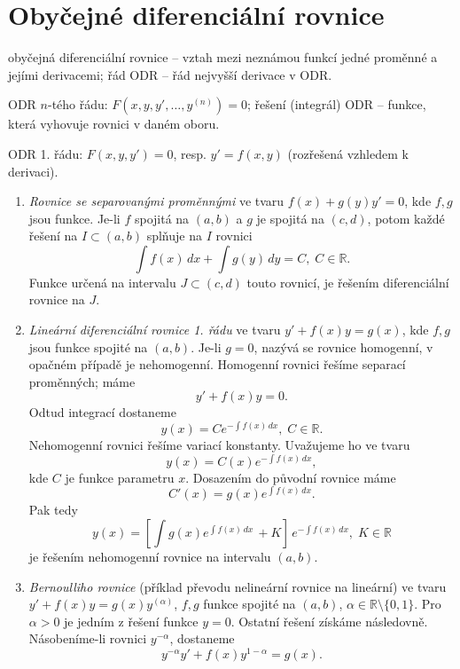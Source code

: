 \chapter{Obyčejné diferenciální rovnice}

obyčejná diferenciální rovnice -- vztah mezi neznámou funkcí jedné proměnné a jejími derivacemi;
řád ODR -- řád nejvyšší derivace v ODR.

ODR $n$-tého řádu: $F(x,y,y',\ldots,y^{(n)})=0$;
řešení (integrál) ODR -- funkce, která vyhovuje rovnici v daném oboru.

ODR 1. řádu: $F(x,y,y')=0$, resp. $y'=f(x,y)$ (rozřešená vzhledem k derivaci).

\begin{enumerate}
   \item \emph{Rovnice se separovanými proměnnými} ve tvaru $f(x)+g(y)y'=0$,
   kde $f,g$ jsou funkce. 
   Je-li $f$ spojitá na $(a,b)$ a $g$ je spojitá na $(c,d)$,
   potom každé řešení na $I\subset(a,b)$ splňuje na $I$ rovnici
   \[
      \int f(x)\,dx + \int g(y)\,dy = C, \; C\in\mathbb{R}.
   \]
   Funkce určená na intervalu $J\subset(c,d)$ touto rovnicí, je řešením diferenciální rovnice na $J$.
   \item \emph{Lineární diferenciální rovnice 1. řádu} ve tvaru $y'+f(x)y=g(x)$,
   kde $f,g$ jsou funkce spojité na $(a,b)$.
   Je-li $g=0$, nazývá se rovnice homogenní, v opačném případě je nehomogenní.
   Homogenní rovnici řešíme separací proměnných; máme
   \[
      y'+f(x)y = 0.
   \]
   Odtud integrací dostaneme
   \[
      y(x) = Ce^{-\int f(x)\,dx}, \; C\in\mathbb{R}.
   \]
   Nehomogenní rovnici řešíme variací konstanty. Uvažujeme ho ve tvaru
   \[
      y(x) = C(x)e^{-\int f(x)\,dx},
   \]
   kde $C$ je funkce parametru $x$.
   Dosazením do původní rovnice máme
   \[
      C'(x) = g(x)e^{\int f(x)\,dx}.
   \]
   Pak tedy
   \[
      y(x)=\left[\int g(x)e^{\int f(x)\,dx}\,+K\right]\,e^{-\int f(x)\,dx}, \;K\in\mathbb{R}
   \]
   je řešením nehomogenní rovnice na intervalu $(a,b)$.
   \item \emph{Bernoulliho rovnice} (příklad převodu nelineární rovnice na lineární) ve tvaru 
   $y'+f(x)y=g(x)y^(\alpha)$, $f,g$ funkce spojité na $(a,b)$, $\alpha\in\mathbb{R}\setminus\{0,1\}$.
   Pro $\alpha>0$ je jedním z řešení funkce $y=0$.
   Ostatní řešení získáme následovně.
   Násobeníme-li rovnici $y^{-\alpha}$, dostaneme
   \[
      y^{-\alpha}y' + f(x)y^{1-\alpha} = g(x).
\]
\end{enumerate}
